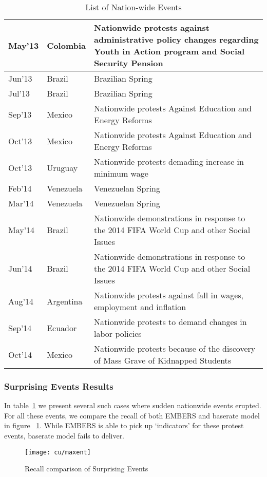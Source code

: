 \begin{table}
\caption{List of Nation-wide Events}
\renewcommand{\arraystretch}{1.1}
\vspace{-3mm}
 \centering
 \begin{tabular}{|l|l|m{6cm}|}
 \hline
May'13  &  Colombia	 &  Nationwide protests against administrative policy changes regarding Youth in Action program and Social Security Pension \\ \hline
Jun'13  &  Brazil  &  Brazilian Spring \\ \hline
Jul'13  &  Brazil  &  Brazilian Spring \\ \hline
Sep'13  &  Mexico  &  Nationwide protests Against Education and Energy Reforms \\ \hline
Oct'13  &  Mexico  &  Nationwide protests Against Education and Energy Reforms \\ \hline
Oct'13  &  Uruguay  &  Nationwide protests demading increase in minimum wage \\ \hline
Feb'14  &  Venezuela	  &  Venezuelan Spring \\ \hline
Mar'14  &  Venezuela  &  	Venezuelan Spring \\ \hline
May'14  &  Brazil  &  Nationwide demonstrations in response to the 2014 FIFA World Cup and other Social Issues \\ \hline
Jun'14  &  Brazil  &  Nationwide demonstrations in response to the 2014 FIFA World Cup and other Social Issues \\ \hline
Aug'14  &  Argentina	  &  Nationwide protests against fall in wages, employment and inflation \\ \hline
Sep'14  &  Ecuador  &  Nationwide protests to demand changes in labor policies \\ \hline
Oct'14  &  Mexico  &  Nationwide protests because of the discovery of Mass Grave of Kidnapped Students  \\ \hline
\end{tabular}
\vspace{-5mm}
\label{tab:maxentEvents}
\end{table}


\subsubsection{Surprising Events Results}
In table~\ref{tab:maxentEvents} we present several such cases where sudden nationwide events erupted. For all these events, we compare the recall of both EMBERS and baserate model in figure ~\ref{fig:maxent}. While EMBERS is able to pick up `{indicators}' for these protest events, baserate model fails to deliver.

\begin{figure}[H]
\centering
\texttt{[image: cu/maxent]}
\caption{Recall comparison of Surprising Events}
\label{fig:maxent}
\end{figure}